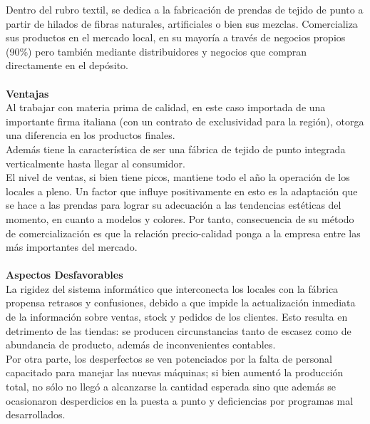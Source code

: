 \documentclass[a4paper,10pt,titlepage]{article}
\begin{document}
	Dentro del rubro textil, se dedica a la fabricaci\'{o}n de prendas de tejido de punto a partir de hilados de fibras naturales, artificiales o bien sus mezclas.
	Comercializa sus productos en el mercado local, en su mayor\'{i}a a trav\'{e}s de negocios propios (90\%) pero tambi\'{e}n mediante distribuidores y negocios 
	que compran directamente en el dep\'{o}sito.\\ \\

	\textbf{Ventajas}\\
	Al trabajar con materia prima de calidad, en este caso importada de una importante firma italiana (con un contrato de exclusividad para la regi\'{o}n),
	otorga una diferencia en los productos finales.\\
	
	Adem\'{a}s tiene la caracter\'{i}stica de ser una f\'{a}brica de tejido de punto integrada verticalmente hasta llegar al consumidor.\\
	
	El nivel de ventas, si bien tiene picos, mantiene todo el a\~no la operaci\'{o}n de los locales a pleno. Un factor que influye positivamente en esto es la adaptaci\'{o}n que se hace a las prendas para lograr su adecuaci\'{o}n a las tendencias est\'{e}ticas del momento, en cuanto a modelos y colores.
	Por tanto, consecuencia de su m\'{e}todo de comercializaci\'{o}n es que la relaci\'{o}n precio-calidad ponga a la empresa entre las m\'{a}s importantes del mercado.\\ \\

	\textbf {Aspectos Desfavorables}\\
	La rigidez del sistema inform\'{a}tico que interconecta los locales con la f\'{a}brica propensa retrasos y confusiones, debido a que impide la actualizaci\'{o}n inmediata de la informaci\'{o}n sobre ventas, stock y pedidos de los clientes. Esto resulta en detrimento de las tiendas: se producen circunstancias tanto de escasez como de abundancia de producto, adem\'{a}s de inconvenientes contables.\\
	
	Por otra parte, los desperfectos se ven potenciados por la falta de personal capacitado para manejar las nuevas m\'{a}quinas; si bien aument\'{o} la producci\'{o}n total, no s\'{o}lo no lleg\'{o} a alcanzarse la cantidad esperada sino que adem\'{a}s se ocasionaron desperdicios en la puesta a punto y deficiencias por programas mal desarrollados.
\end{document}
